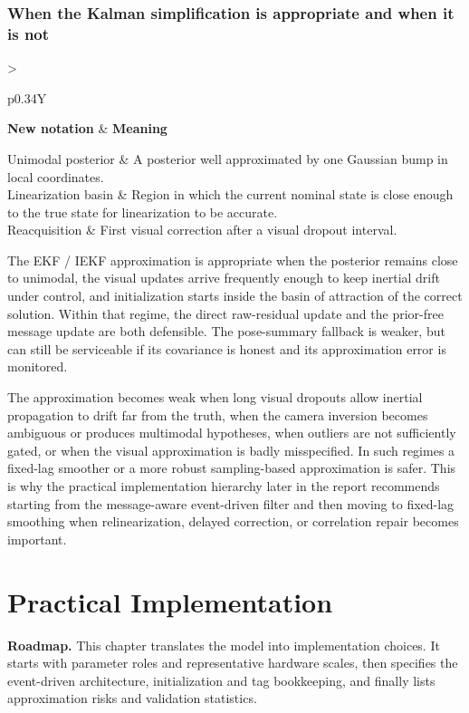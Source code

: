 \documentclass[11pt]{report}
\newcommand{\NotationTable}[1]{%
\vspace{0.6mm}
{\scriptsize
\setlength{\tabcolsep}{2.5pt}
\begin{tabularx}{\columnwidth}{>{\raggedright\arraybackslash}p{0.34\columnwidth}Y}
\toprule
\textbf{New notation} & \textbf{Meaning}\\
\midrule
#1\\
\bottomrule
\end{tabularx}}
\vspace{0.8mm}}
\newcommand{\ChapterRoadmap}[1]{%
\begin{center}
\begin{minipage}{0.94\textwidth}
\small\textbf{Roadmap.} #1
\end{minipage}
\end{center}
\vspace{1mm}}
\begin{document}
\subsection{When the Kalman simplification is appropriate and when it is not}
\NotationTable{
Unimodal posterior & A posterior well approximated by one Gaussian bump in local coordinates.\\
Linearization basin & Region in which the current nominal state is close enough to the true state for linearization to be accurate.\\
Reacquisition & First visual correction after a visual dropout interval.}

The EKF / IEKF approximation is appropriate when the posterior remains close to unimodal, the visual updates arrive frequently enough to keep inertial drift under control, and initialization starts inside the basin of attraction of the correct solution. Within that regime, the direct raw-residual update and the prior-free message update are both defensible. The pose-summary fallback is weaker, but can still be serviceable if its covariance is honest and its approximation error is monitored.

The approximation becomes weak when long visual dropouts allow inertial propagation to drift far from the truth, when the camera inversion becomes ambiguous or produces multimodal hypotheses, when outliers are not sufficiently gated, or when the visual approximation is badly misspecified. In such regimes a fixed-lag smoother or a more robust sampling-based approximation is safer. This is why the practical implementation hierarchy later in the report recommends starting from the message-aware event-driven filter and then moving to fixed-lag smoothing when relinearization, delayed correction, or correlation repair becomes important.
\chapter{Practical Implementation}
\ChapterRoadmap{This chapter translates the model into implementation choices. It starts with parameter roles and representative hardware scales, then specifies the event-driven architecture, initialization and tag bookkeeping, and finally lists approximation risks and validation statistics.}
\end{document}
